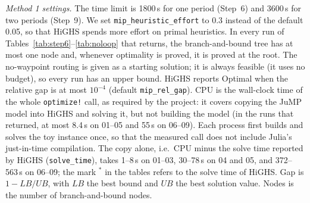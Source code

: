 \documentclass[conference]{IEEEtran}
\begin{document}
\emph{Method 1 settings.} The time limit is 1800\,s for one period (Step~6) and 3600\,s for two periods (Step~9). We set \texttt{mip\_heuristic\_effort} to 0.3 instead of the default 0.05, so that HiGHS spends more effort on primal heuristics. In every run of Tables~\ref{tab:step6}--\ref{tab:noloop} that returns, the branch-and-bound tree has at most one node and, whenever optimality is proved, it is proved at the root. The no-waypoint routing is given as a starting solution; it is always feasible (it uses no budget), so every run has an upper bound. HiGHS reports Optimal when the relative gap is at most $10^{-4}$ (default \texttt{mip\_rel\_gap}). CPU is the wall-clock time of the whole \texttt{optimize!} call, as required by the project: it covers copying the JuMP model into HiGHS and solving it, but not building the model (in the runs that returned, at most 8.4\,s on 01--05 and 55\,s on 06--09). Each process first builds and solves the toy instance once, so that the measured call does not include Julia's just-in-time compilation. The copy alone, i.e.\ CPU minus the solve time reported by HiGHS (\texttt{solve\_time}), takes 1--8\,s on 01--03, 30--78\,s on 04 and 05, and 372--563\,s on 06--09; the mark $^*$ in the tables refers to the solve time of HiGHS. Gap is $1-LB/UB$, with $LB$ the best bound and $UB$ the best solution value. Nodes is the number of branch-and-bound nodes.
\end{document}
